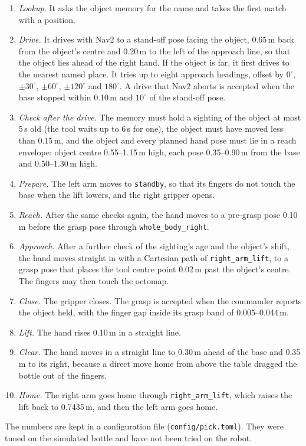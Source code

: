 \documentclass[12pt,a4paper]{article}
\begin{document}
\begin{enumerate}[itemsep=1pt]
    \item \emph{Lookup.} It asks the object memory for the name and takes the first match with a position.
    \item \emph{Drive.} It drives with Nav2 to a stand-off pose facing the object, 0.65\,m back from the
          object's centre and 0.20\,m to the left of the approach line, so that the object lies ahead of
          the right hand. If the object is far, it first drives to the nearest named place. It tries up to
          eight approach headings, offset by $0^\circ$, $\pm30^\circ$, $\pm60^\circ$, $\pm120^\circ$ and
          $180^\circ$. A drive that Nav2 aborts is accepted when the base stopped within 0.10\,m and
          $10^\circ$ of the stand-off pose.
    \item \emph{Check after the drive.} The memory must hold a sighting of the object at most 5\,s old
          (the tool waits up to 6\,s for one), the object must have moved less than 0.15\,m, and the object
          and every planned hand pose must lie in a reach envelope: object centre 0.55--1.15\,m high, each
          pose 0.35--0.90\,m from the base and 0.50--1.30\,m high.
    \item \emph{Prepare.} The left arm moves to \texttt{standby}, so that its fingers do not touch the base
          when the lift lowers, and the right gripper opens.
    \item \emph{Reach.} After the same checks again, the hand moves to a pre-grasp pose 0.10\,m before the
          grasp pose through \texttt{whole\_body\_right}.
    \item \emph{Approach.} After a further check of the sighting's age and the object's shift, the hand
          moves straight in with a Cartesian path of \texttt{right\_arm\_lift}, to a grasp pose that places
          the tool centre point 0.02\,m past the object's centre. The fingers may then touch the octomap.
    \item \emph{Close.} The gripper closes. The grasp is accepted when the commander reports the object
          held, with the finger gap inside its grasp band of 0.005--0.044\,m.
    \item \emph{Lift.} The hand rises 0.10\,m in a straight line.
    \item \emph{Clear.} The hand moves in a straight line to 0.30\,m ahead of the base and 0.35\,m to its
          right, because a direct move home from above the table dragged the bottle out of the fingers.
    \item \emph{Home.} The right arm goes home through \texttt{right\_arm\_lift}, which raises the lift
          back to 0.7435\,m, and then the left arm goes home.
\end{enumerate}
The numbers are kept in a configuration file (\texttt{config/pick.toml}). They were tuned on the
simulated bottle and have not been tried on the robot.
\end{document}
